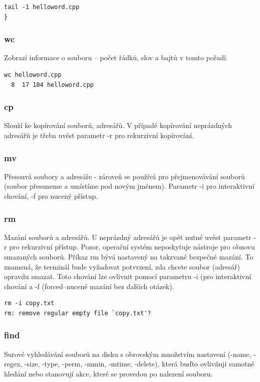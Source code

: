 \documentclass{article}
\begin{document}
\begin{verbatim}
tail -1 helloword.cpp
}
\end{verbatim}

\subsubsection{wc}
Zobrazí informace o souboru -- počet řádků, slov a bajtů v tomto pořadí.
\begin{verbatim}
wc helloword.cpp
  8  17 104 helloword.cpp
\end{verbatim}

\subsubsection{cp}
Slouží ke kopírování souborů, adresářů. V případě kopírování neprázdných adresářů je třeba uvést parametr -r pro rekurzivní kopírování.

\subsubsection{mv}
Přesouvá soubory a adresáře - zároveň se používá pro přejmenovávání souborů (soubor přesuneme a umístíme pod novým jménem). Parametr -i pro interaktivní chování, -f pro nucený přístup.

\subsubsection{rm}
Mazání souborů a adresářů. U neprázdný adresářů je opět nutné uvést parametr -r pro rekurzivní přístup. Pozor, operační systém neposkytuje nástroje pro obnovu smazaných souborů. Příkaz rm bývá nastavený na takzvané bezpečné mazání. To znamená, že terminál bude vyžadovat potvrzení, zda chcete soubor (adresář) opravdu smazat. Toto chování lze ovlivnit pomocí parametru -i (pro interaktivní chování a -f (forced--nucené mazání bez dalších otázek).

\begin{verbatim}
rm -i copy.txt
rm: remove regular empty file `copy.txt'? 
\end{verbatim}

\subsubsection{find}
Surové vyhledávání souborů na disku s obrovským množstvím nastavení (-name, -regex, -size, -type, -perm, -mmin, -mtime, -delete), která buďto ovlivňují samotné hledání nebo stanovují akce, které se provedou po nalezení souboru.
\end{document}
